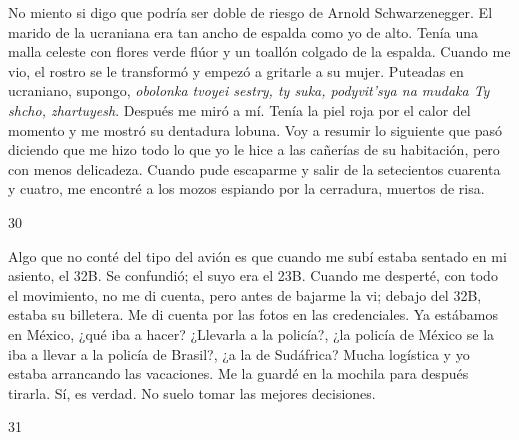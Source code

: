 \documentclass[12pt,twoside,openright,a5paper]{book}
\begin{document}
\nopagebreak

\vspace{0.5cm}

\nopagebreak

No miento si digo que podría ser doble de riesgo de Arnold Schwarzenegger. El
marido de la ucraniana era tan ancho de espalda como yo de alto. Tenía
una malla celeste con flores verde flúor y un toallón colgado de la
espalda. Cuando me vio, el rostro se le transformó y empezó a gritarle a
su mujer. Puteadas en ucraniano, supongo, \emph{obolonka tvoyei sestry, ty suka,
podyvit'sya na mudaka Ty shcho, zhartuyesh}. Después me miró a mí. Tenía
la piel roja por el calor del momento y me mostró su dentadura lobuna. Voy
a resumir lo siguiente que pasó diciendo que me hizo todo lo que yo le
hice a las cañerías de su habitación, pero con menos delicadeza. Cuando
pude escaparme y salir de la setecientos cuarenta y cuatro, me encontré a
los mozos espiando por la cerradura, muertos de risa.

\vspace{0.5cm}

\hrulefill \hspace{0.1cm}\decofourleft\hspace{0.2cm} 30 \hspace{0.2cm}\decofourright \hspace{0.1cm}\hrulefill

\nopagebreak

\vspace{0.5cm}

\nopagebreak

Algo que no conté del tipo del avión es que cuando me subí estaba
sentado en mi asiento, el 32B. Se confundió; el suyo era el 23B. Cuando
me desperté, con todo el movimiento, no me di cuenta, pero antes de bajarme
la vi; debajo del 32B, estaba su billetera. Me di cuenta por las fotos en
las credenciales. Ya estábamos en México, ¿qué iba a hacer? ¿Llevarla
a la policía?, ¿la policía de México se la iba a llevar a la policía
de Brasil?, ¿a la de Sudáfrica? Mucha logística y yo estaba arrancando
las vacaciones. Me la guardé en la mochila para después tirarla. Sí,
es verdad. No suelo tomar las mejores decisiones.

\vspace{0.5cm}

\hrulefill \hspace{0.1cm}\decofourleft\hspace{0.2cm} 31 \hspace{0.2cm}\decofourright \hspace{0.1cm}\hrulefill
\end{document}
